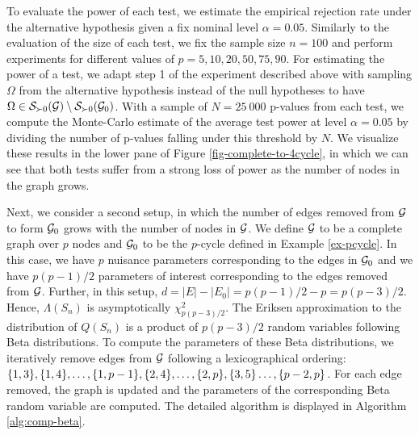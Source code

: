 To evaluate the power of each test, we estimate the empirical rejection rate under the alternative hypothesis given a fix nominal level $\alpha = 0.05$. Similarly to the evaluation of the size of each test, we fix the sample size $n = 100$ and perform experiments for different values of $p = 5, 10, 20, 50, 75, 90$. For estimating the power of a test, we adapt step 1 of the experiment described above with sampling $\Omega$ from the alternative hypothesis instead of the null hypotheses to have $\Omega \in {\mathcal{S}}_{\succ 0}({\mathcal{G}}) \setminus {\mathcal{S}}_{\succ 0}({\mathcal{G}}_0)$. With a sample of $N = 25\ 000$ p-values from each test, we compute the Monte-Carlo estimate of the average test power at level $\alpha = 0.05$ by dividing the number of p-values falling under this threshold by $N$. We visualize these results in the lower pane of Figure \ref{fig-complete-to-4cycle}, in which we can see that both tests suffer from a strong loss of power as the number of nodes in the graph grows.


Next, we consider a second setup, in which the number of edges removed from ${\mathcal{G}}$ to form ${\mathcal{G}}_0$ grows with the number of nodes in ${\mathcal{G}}$. We define ${\mathcal{G}}$ to be a complete graph over $p$ nodes and ${\mathcal{G}}_0$ to be the $p$-cycle defined in Example \ref{ex-pcycle}. In this case, we have $p$ nuisance parameters corresponding to the edges in ${\mathcal{G}}_0$ and we have $p(p-1)/2$ parameters of interest corresponding to the edges removed from ${\mathcal{G}}$. Further, in this setup, $d = |E| - |E_0| = p(p-1)/2 - p = p(p-3)/2$. Hence, $\Lambda(S_n)$ is asymptotically $\chi^2_{p(p-3)/2}$. The Eriksen approximation to the distribution of $Q(S_n)$ is a product of $p(p-3)/2$ random variables following Beta distributions. To compute the parameters of these Beta distributions, we iteratively remove edges from ${\mathcal{G}}$ following a lexicographical ordering: ${\left\{1, 3\right\}}, {\left\{1, 4\right\}}, \ldots, {\left\{1, p-1\right\}}, {\left\{2, 4\right\}}, \ldots, {\left\{2, p\right\}}, {\left\{3, 5\right\}} \ldots, {\left\{p-2, p\right\}}$. For each edge removed, the graph is updated and the parameters of the corresponding Beta random variable are computed. The detailed algorithm is displayed in Algorithm \ref{alg:comp-beta}.


